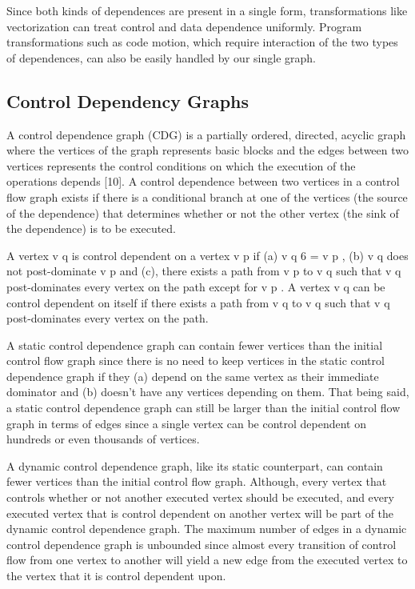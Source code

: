 Since both kinds of dependences are present in a single form, transformations like vectorization can treat control and data dependence uniformly. Program transformations such as code motion, which require interaction of the two types of dependences, can also be easily handled by our single graph.


\subsection{Control Dependency Graphs}
A control dependence graph (CDG) is a partially ordered, directed, acyclic graph where the vertices of the graph represents basic blocks and the edges between two vertices represents the control conditions on which the execution of the operations depends [10]. A control dependence between two vertices in a control flow graph exists if there is a conditional branch at one of the vertices
(the source of the dependence) that determines whether or not the other vertex (the sink of the dependence) is to be executed.

A vertex v q is control dependent on a vertex v p if (a) v q 6 = v p , (b) v q does not post-dominate v p and (c), there exists a path from v p to v q such that v q post-dominates every vertex on the path except for v p . A vertex v q can be control dependent on itself if there exists a path from v q to v q such that v q post-dominates every vertex on the path.

A static control dependence graph can contain fewer vertices than the initial control flow graph since there is no need to keep vertices in the static control dependence graph if they (a) depend on the same vertex as their immediate dominator and (b) doesn’t have any vertices depending on them. That being said, a static control dependence graph can still be larger than the initial control flow graph in terms of edges since a single vertex can be control dependent on hundreds or even thousands of vertices.

A dynamic control dependence graph, like its static counterpart, can contain fewer vertices than the initial control flow graph. Although, every vertex that controls whether or not another executed vertex should be executed, and every executed vertex that is control dependent on another vertex will be part of the dynamic control dependence graph. The maximum number of edges in a
dynamic control dependence graph is unbounded since almost every transition of control flow from one vertex to another will yield a new edge from the executed vertex to the vertex that it is control dependent upon.


